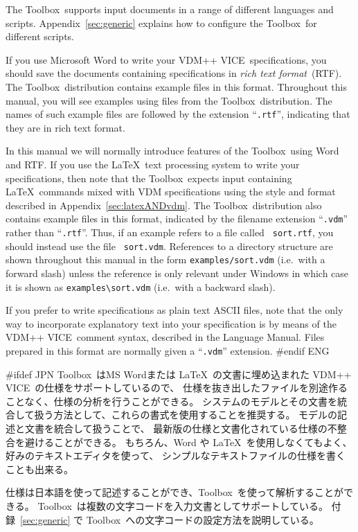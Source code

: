 \documentclass[\pformat,12pt]{article}
\newcommand{\vdmslpp}{VDM-SL}
\newcommand{\Toolbox}{Toolbox}
\newcommand{\vdmext}{vdm}
\newcommand{\vdmslpp}{VDM++}
\newcommand{\Toolbox}{Toolbox}
\renewcommand{\vdmslpp}{VDM++ VICE}
\newcommand{\vdmext}{vpp}
\begin{document}
The \Toolbox\ supports input documents in a range of different
languages and scripts. 
Appendix~\ref{sec:generic} explains how to 
configure the \Toolbox\ for different scripts. 

If you use Microsoft Word to write your \vdmslpp\ specifications, you
should save the documents containing specifications in {\em rich text
  format\/}~(RTF). The \Toolbox\ distribution contains example files in
this format. Throughout this manual, you will see examples using files
from the \Toolbox\ distribution. The names of such example files are
followed by the extension ``{\tt .rtf}'', indicating that they are in
rich text format. 

In this manual we will normally introduce features of the \Toolbox\ 
using Word and RTF.  If you use the \LaTeX\ text processing system to
write your specifications, then note that the \Toolbox\ expects input
containing \LaTeX\ commands mixed with VDM specifications using the
style and format described in Appendix~\ref{sec:latexANDvdm}. The
\Toolbox\ distribution also contains example files in this format,
indicated by the filename extension ``{\tt .\vdmext}'' rather than
``{\tt .rtf}''.  Thus, if an example refers to a file called {\tt
  sort.rtf}, you should instead use the file {\tt
  sort.\vdmext}. References to a directory structure are shown
throughout this manual in the form {\tt examples/sort.vdm} (i.e.\ with a
forward slash)   unless the reference is only relevant under Windows
in which case  it is shown as \verb+examples\sort.vdm+ (i.e.\ with a
backward slash).

If you prefer to write specifications as plain text ASCII files, 
note that the only way to incorporate explanatory text into your
specification is by means of the \vdmslpp\ comment syntax, described
in the Language Manual. Files prepared in this format are normally
given a ``{\tt .\vdmext}'' extension.
#endif ENG

#ifdef JPN
\Toolbox\ はMS Wordまたは \LaTeX\ の文書に埋め込まれた \vdmslpp\ の仕様をサポートしているので、
仕様を抜き出したファイルを別途作ることなく、仕様の分析を行うことができる。
システムのモデルとその文書を統合して扱う方法として、これらの書式を使用することを推奨する。
モデルの記述と文書を統合して扱うことで、
最新版の仕様と文書化されている仕様の不整合を避けることができる。
もちろん、Word や \LaTeX\ を使用しなくてもよく、好みのテキストエディタを使って、
シンプルなテキストファイルの仕様を書くことも出来る。

仕様は日本語を使って記述することができ、\Toolbox\ を使って解析することができる。
\Toolbox\ は複数の文字コードを入力文書としてサポートしている。
付録~\ref{sec:generic}
で \Toolbox\ への文字コードの設定方法を説明している。
\end{document}
